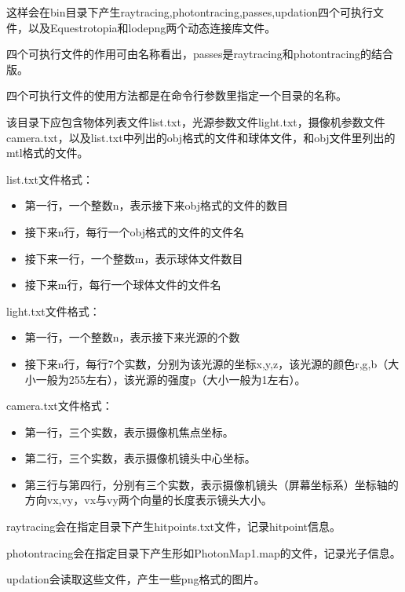 \documentclass[a4paper,12pt]{article}
\theoremstyle{plain}
\numberwithin{thmdef}{section}
\begin{document}
这样会在bin目录下产生raytracing,photontracing,passes,updation四个可执行文件，以及Equestrotopia和lodepng两个动态连接库文件。\par
四个可执行文件的作用可由名称看出，passes是raytracing和photontracing的结合版。\par
四个可执行文件的使用方法都是在命令行参数里指定一个目录的名称。\par
该目录下应包含物体列表文件list.txt，光源参数文件light.txt，摄像机参数文件camera.txt，以及list.txt中列出的obj格式的文件和球体文件，和obj文件里列出的mtl格式的文件。\par
list.txt文件格式：
\begin{itemize}
    \small \setlength{\itemsep}{.1em}
    \item 第一行，一个整数n，表示接下来obj格式的文件的数目
    \item 接下来n行，每行一个obj格式的文件的文件名
    \item 接下来一行，一个整数m，表示球体文件数目
    \item 接下来m行，每行一个球体文件的文件名
\end{itemize}
light.txt文件格式：
\begin{itemize}
    \small \setlength{\itemsep}{.1em}
    \item 第一行，一个整数n，表示接下来光源的个数
    \item 接下来n行，每行7个实数，分别为该光源的坐标x,y,z，该光源的颜色r,g,b（大小一般为255左右），该光源的强度p（大小一般为1左右）。
\end{itemize}
camera.txt文件格式：
\begin{itemize}
    \small \setlength{\itemsep}{.1em}
    \item 第一行，三个实数，表示摄像机焦点坐标。
    \item 第二行，三个实数，表示摄像机镜头中心坐标。
    \item 第三行与第四行，分别有三个实数，表示摄像机镜头（屏幕坐标系）坐标轴的方向vx,vy，vx与vy两个向量的长度表示镜头大小。
\end{itemize}
raytracing会在指定目录下产生hitpoints.txt文件，记录hitpoint信息。\par
photontracing会在指定目录下产生形如PhotonMap1.map的文件，记录光子信息。\par
updation会读取这些文件，产生一些png格式的图片。
\end{document}
